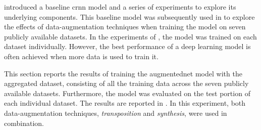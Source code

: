 
 introduced a baseline \gls{crnn}
model and a series of experiments to explore its underlying
components. This baseline model was subsequently used in
 to explore the effects of
data-augmentation techniques when training the model on
seven publicly available datasets. In the experiments of
, the model was trained on
each dataset individually. However, the best performance of
a deep learning model is often achieved when more data is
used to train it.

This section reports the results of training the
\gls{augmentednet} model with the aggregated dataset,
consisting of all the training data across the seven
publicly available datasets. Furthermore, the model was
evaluated on the test portion of each individual dataset.
The results are reported in .
In this experiment, both data-augmentation techniques,
\emph{transposition} and \emph{synthesis}, were used in
combination. 

